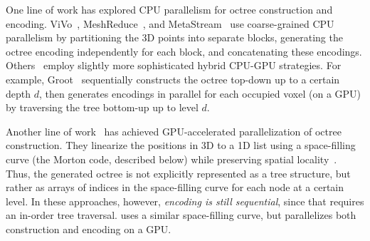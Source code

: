 %
One line of work has explored CPU parallelism for octree construction and encoding.
%
ViVo~\cite{vivo}, MeshReduce~\cite{meshreduce}, and MetaStream~\cite{metastream} use coarse-grained CPU parallelism by partitioning the 3D points into separate blocks, generating the octree encoding independently for each block, and concatenating these encodings.
%
Others~\cite{octree-cpu2020,groot} employ slightly more sophisticated hybrid CPU-GPU strategies.
%
For example, Groot~\cite{groot} sequentially constructs the octree top-down up to a certain depth $d$, then generates encodings in parallel for each occupied voxel (on a GPU) by traversing the tree bottom-up up to level $d$.

Another line of work~\cite{octree-cpu2008,octree-gpu2011,octree-gpu2012} has achieved GPU-accelerated parallelization of octree construction.
%
They linearize the positions in 3D to a 1D list using a space-filling curve (the Morton code, described below) while preserving spatial locality~\cite{morton-code-spc}.
%
Thus, the generated octree is not explicitly represented as a tree structure, but rather as arrays of indices in the space-filling curve for each node at a certain level. 
%
In these approaches, however, \textit{encoding is still sequential}, since that requires an in-order tree traversal.
%
\gsnfs{} uses a similar space-filling curve, but parallelizes both construction and encoding on a GPU.

%


